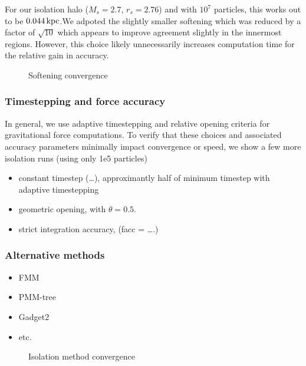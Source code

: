 For our isolation halo (\(M_s=2.7\), \(r_s=2.76\)) and with \(10^7\)
particles, this works out to be \(0.044\,{\rm kpc}\).We adpoted the
slightly smaller softening which was reduced by a factor of
\(\sqrt{10}\) which appears to improve agreement slightly in the
innermost regions. However, this choice likely unnecessarily increases
computation time for the relative gain in accuracy.

\begin{figure}
\centering
{}
\caption{Softening convergence}\label{fig:softening_convergence}
\end{figure}

\subsubsection{Timestepping and force
accuracy}\label{timestepping-and-force-accuracy}

In general, we use adaptive timestepping and relative opening criteria
for gravitational force computations. To verify that these choices and
associated accuracy parameters minimally impact convergence or speed, we
show a few more isolation runs (using only 1e5 particles)

\begin{itemize}
\tightlist
\item
  constant timestep (\ldots), approximantly half of minimum timestep
  with adaptive timestepping
\item
  geometric opening, with \(\theta = 0.5\).
\item
  strict integration accuracy, (facc = \ldots.)
\end{itemize}

\subsubsection{Alternative methods}\label{alternative-methods}

\begin{itemize}
\tightlist
\item
  FMM
\item
  PMM-tree
\item
  Gadget2
\item
  etc.
\end{itemize}

\begin{figure}
\centering
{}
\caption{Isolation method convergence}\label{fig:methods_convergence}
\end{figure}

